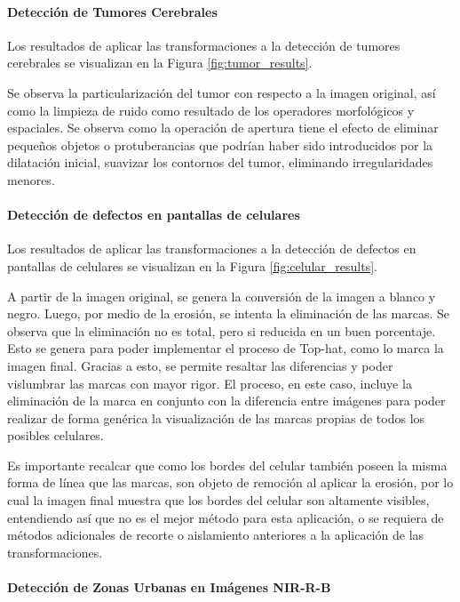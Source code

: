 \paragraph{Detección de Tumores Cerebrales} Los resultados de aplicar las transformaciones a la detección de tumores cerebrales se visualizan en la Figura \ref{fig:tumor_results}.

Se observa la particularización del tumor con respecto a la imagen original, así como la limpieza de ruido como resultado de los operadores morfológicos y espaciales. Se observa como la operación de apertura tiene el efecto de eliminar pequeños objetos o protuberancias que podrían haber sido introducidos por la dilatación inicial, suavizar los contornos del tumor, eliminando irregularidades menores.

\paragraph{Detección de defectos en pantallas de celulares} Los resultados de aplicar las transformaciones a la detección de defectos en pantallas de celulares se visualizan en la Figura \ref{fig:celular_results}.

A partir de la imagen original, se genera la conversión de la imagen a blanco y negro. Luego, por medio de la erosión, se intenta la eliminación de las marcas. Se observa que la eliminación no es total, pero si reducida en un buen porcentaje. Esto se genera para poder implementar el proceso de Top-hat, como lo marca la imagen final. Gracias a esto, se permite resaltar las diferencias y poder vislumbrar las marcas con mayor rigor. El proceso, en este caso, incluye la eliminación de la marca en conjunto con la diferencia entre imágenes para poder realizar de forma genérica la visualización de las marcas propias de todos los posibles celulares.

Es importante recalcar que como los bordes del celular también poseen la misma forma de línea que las marcas, son objeto de remoción al aplicar la erosión, por lo cual la imagen final muestra que los bordes del celular son altamente visibles, entendiendo así que no es el mejor método para esta aplicación, o se requiera de métodos adicionales de recorte o aislamiento anteriores a la aplicación de las transformaciones.


\paragraph{Detección de Zonas Urbanas en Imágenes NIR-R-B}

